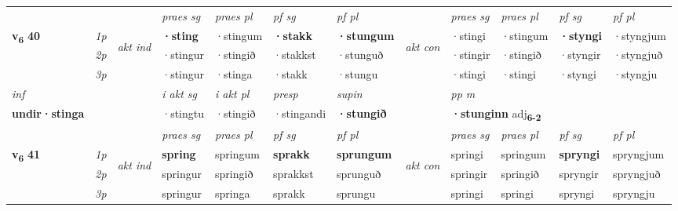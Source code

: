 \begin{longtable}[l]{X>{\footnotesize\itshape}llXXXXlXXXX}
\midrule

 & &   & \textit{praes sg}  & \textit{praes pl}    & \textit{ pf sg} & \textit{pf pl} & & \textit{praes sg}  & \textit{praes pl}    & \textit{pf sg} & \textit{pf pl }  \\ \cmidrule{4-7} \cmidrule{9-12}
 \multirow{2}{*}{{{\textbf{v{\textsubscript{6}}} \Large{\textbf{40}}}}}  & 1p & \multirow{3}{*}{\begin{turn}{90}\textit{akt ind}\end{turn}} & \textbf{·sting} & ·stingum & \textbf{·stakk} & \textbf{·stungum} & \multirow{3}{*}{\begin{turn}{90}\textit{akt con}\end{turn}} &·stingi & ·stingum & \textbf{·styngi} & ·styngjum\\*
 & 2p &  &  ·stingur  & ·stingið & ·stakkst & ·stunguð & & ·stingir & ·stingið & ·styngir & ·styngjuð \\*
 & 3p &  & ·stingur & ·stinga & ·stakk & ·stungu & & ·stingi & ·stingi& ·styngi & ·styngju \\*
\cmidrule{4-7} \cmidrule{9-12}

   {\textit{inf}} & &  & \textit{i akt sg} & \textit{i akt pl}   & \textit{presp} & \textit{supin}  && \textit{pp m} \\*
  {\textbf{undir\allowbreak ·stinga}} & && ·stingtu  & ·stingið   & ·stingandi &  \textbf{·stungið}  && \multicolumn{2}{l}{\textbf{·stunginn} adj\textbf{\textsubscript{6-2}}} \\*

\midrule

 & &   & \textit{praes sg}  & \textit{praes pl}    & \textit{ pf sg} & \textit{pf pl} & & \textit{praes sg}  & \textit{praes pl}    & \textit{pf sg} & \textit{pf pl }  \\ \cmidrule{4-7} \cmidrule{9-12}
 \multirow{2}{*}{{{\textbf{v{\textsubscript{6}}} \Large{\textbf{41}}}}}  & 1p & \multirow{3}{*}{\begin{turn}{90}\textit{akt ind}\end{turn}} & \textbf{spring} & springum & \textbf{sprakk} & \textbf{sprungum} & \multirow{3}{*}{\begin{turn}{90}\textit{akt con}\end{turn}} &springi & springum & \textbf{spryngi} & spryngjum\\*
 & 2p &  &  springur  & springið & sprakkst & sprunguð & & springir & springið & spryngir & spryngjuð \\*
 & 3p &  & springur & springa & sprakk & sprungu & & springi & springi& spryngi & spryngju \\*
\cmidrule{4-7} \cmidrule{9-12}


\end{longtable}
